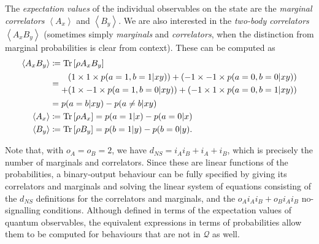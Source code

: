 \documentclass[10pt, a4paper]{article}
\numberwithin{equation}{section} %
\theoremstyle{definition}
\theoremstyle{plain}
\newcommand{\?}{\mathrel{?}} %
\newcommand{\angleb}[1]{\left\langle #1 \right\rangle} %
\newcommand{\Tr}[2][]{\mathop{\mathrm{Tr}#1}\left[ #2 \right]} %
\newcommand{\Qs}{\mathcal{Q}}
\begin{document}
    The \emph{expectation values} of the individual observables on the state are the \emph{marginal correlators}  \(\angleb{A_x}\) and \(\angleb{B_y}\). We are also interested in the \emph{two-body correlators} \(\angleb{A_x B_y}\) (sometimes simply \emph{marginals} and \emph{correlators}, when the distinction from marginal probabilities is clear from context). These can be computed as
    \begin{align}
      \angleb{A_x B_y} &\coloneqq \Tr{\rho{A_x B_y}} \\
                       &= \begin{aligned}[c]
                         (1 \times 1 \times p(a=1,b=1|xy)) + (-1 \times -1 \times p(a=0,b=0|xy)) \\
                         + (1 \times -1 \times p(a=1,b=0|xy)) + (-1 \times 1 \times p(a=0,b=1|xy))
                       \end{aligned} \notag \\
                       &= p(a=b|xy) - p(a\neq b|xy) \\
      \angleb{A_x} &\coloneqq \Tr{\rho{A_x}} = p(a=1|x) - p(a=0|x) \\
      \angleb{B_y} &\coloneqq \Tr{\rho{B_y}} = p(b=1|y) - p(b=0|y).
    \end{align}

    Note that, with \(o_A = o_B = 2\), we have \(d_{NS} = {i_A}{i_B} + i_A + i_B\), which is precisely the number of marginals and correlators. Since these are linear functions of the probabilities, a binary-output behaviour can be fully specified by giving its correlators and marginals and solving the linear system of equations consisting of the \(d_{NS}\) definitions for the correlators and marginals, and the \(o_A i_A i_B + o_B i_A i_B\) no-signalling conditions. Although defined in terms of the expectation values of quantum observables, the equivalent expressions in terms of probabilities allow them to be computed for behaviours that are not in \(\Qs\) as well.
\end{document}
